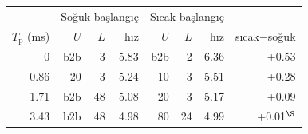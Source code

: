 \begin{tabular}{r|rrr|rrr|r}
\toprule
 & \multicolumn{3}{c|}{Soğuk başlangıç} & \multicolumn{3}{c|}{Sıcak başlangıç} & \\
$T_{\mathrm{p}}$ (ms) & $U$ & $L$ & hız & $U$ & $L$ & hız & sıcak$-$soğuk \\
\midrule
0 & b2b & 3 & 5.83 & b2b & 2 & 6.36 & +0.53 \\
0.86 & 20 & 3 & 5.24 & 10 & 3 & 5.51 & +0.28 \\
1.71 & b2b & 48 & 5.08 & 20 & 3 & 5.17 & +0.09 \\
3.43 & b2b & 48 & 4.98 & 80 & 24 & 4.99 & +0.01$^\S$ \\
\bottomrule
\end{tabular}
